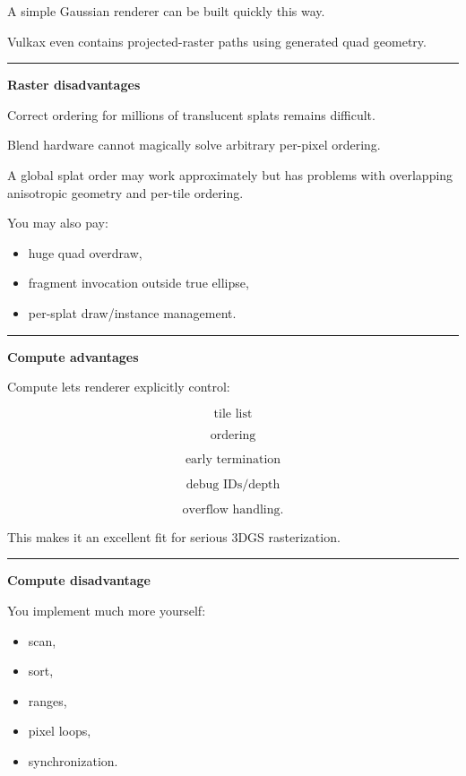 A simple Gaussian renderer can be built quickly this way.

Vulkax even contains projected-raster paths using generated quad geometry.

\begin{center}\rule{0.5\linewidth}{0.5pt}\end{center}

\textbf{Raster disadvantages}

Correct ordering for millions of translucent splats remains difficult.

Blend hardware cannot magically solve arbitrary per-pixel ordering.

A global splat order may work approximately but has problems with overlapping anisotropic geometry and per-tile ordering.

You may also pay:

\begin{itemize}
\tightlist
\item
  huge quad overdraw,
\item
  fragment invocation outside true ellipse,
\item
  per-splat draw/instance management.
\end{itemize}

\begin{center}\rule{0.5\linewidth}{0.5pt}\end{center}

\textbf{Compute advantages}

Compute lets renderer explicitly control:

\[
\text{tile list}
\]

\[
\text{ordering}
\]

\[
\text{early termination}
\]

\[
\text{debug IDs/depth}
\]

\[
\text{overflow handling}.
\]

This makes it an excellent fit for serious 3DGS rasterization.

\begin{center}\rule{0.5\linewidth}{0.5pt}\end{center}

\textbf{Compute disadvantage}

You implement much more yourself:

\begin{itemize}
\tightlist
\item
  scan,
\item
  sort,
\item
  ranges,
\item
  pixel loops,
\item
  synchronization.
\end{itemize}

